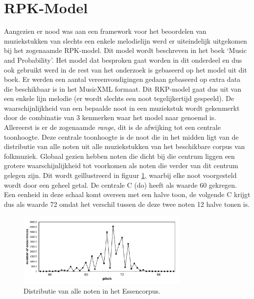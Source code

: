 \section{RPK-Model}
\label{OBM:RPK}
Aangezien er nood was aan een framework voor het beoordelen van muziekstukken van slechts een enkele melodielijn werd er uiteindelijk uitgekomen bij het zogenaamde RPK-model. Dit model wordt beschreven in het boek `Music and Probability'\cite{book:musicAndProbability}. Het model dat besproken gaat worden in dit onderdeel en dus ook gebruikt werd in de rest van het onderzoek is gebaseerd op het model uit dit boek. Er werden een aantal vereenvoudigingen gedaan gebaseerd op extra data die beschikbaar is in het MusicXML formaat. Dit RKP-model gaat dus uit van een enkele lijn melodie (er wordt slechts een noot tegelijkertijd gespeeld). De waarschijnlijkheid van een bepaalde noot in een muziekstuk wordt gekenmerkt door de combinatie van 3 kenmerken waar het model naar genoemd is.\\
Allereerst is er de zogenaamde \textit{range}, dit is de afwijking tot een centrale toonhoogte. Deze centrale toonhoogte is de noot die in het midden ligt van de distributie van alle noten uit alle muziekstukken van het beschikbare corpus van folkmuziek. Globaal gezien hebben noten die dicht bij die centrum liggen een grotere waarschijnlijkheid tot voorkomen als noten die verder van dit centrum gelegen zijn. Dit wordt ge\"illustreerd in figuur \ref{figuur:range}, waarbij elke noot voorgesteld wordt door een geheel getal. De centrale C (do) heeft als waarde 60 gekregen. Een eenheid in deze schaal komt overeen met een halve toon, de volgende C krijgt dus als waarde 72 omdat het verschil tussen de deze twee noten 12 halve tonen is.\\ 

\begin{figure}[!ht]
  \centering
  \includegraphics[width=0.75\textwidth]{2_Objectieve_Beoordeling/range}
  \caption{Distributie van alle noten in het Essencorpus.}
  \label{figuur:range}
\end{figure}

